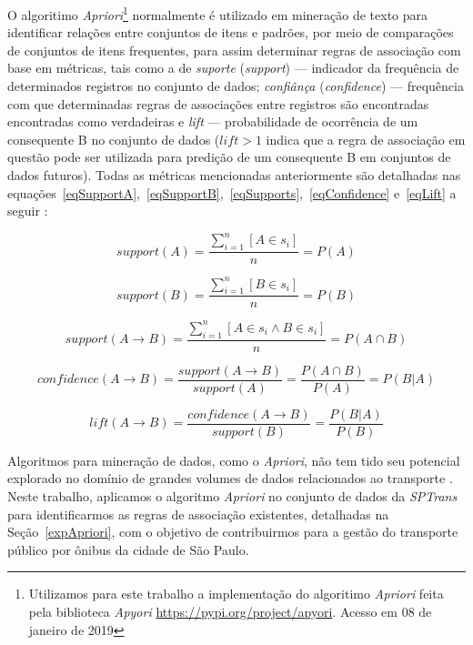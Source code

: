 \documentclass[
	12pt,				%
	oneside,			%
	a4paper,			%
	english,			%
	brazil				%
	]{abntex2ppgsi}
\begin{document}
{{{O algoritimo \textit{Apriori}\footnote{Utilizamos para este trabalho a implementação do algoritimo \textit{Apriori} feita pela biblioteca \textit{Apyori}  \url{https://pypi.org/project/apyori}. Acesso em 08 de janeiro de 2019} normalmente é utilizado em mineração de texto para identificar relações entre conjuntos de itens e padrões, por meio de comparações de conjuntos de itens frequentes, para assim determinar regras de associação com base em métricas, tais como a de \textit{suporte} (\textit{support}) --- indicador da frequência de determinados registros no conjunto de dados; \textit{confiânça} (\textit{confidence}) --- frequência com que determinadas regras de associações entre registros são encontradas encontradas como verdadeiras e \textit{lift} --- probabilidade de ocorrência de um consequente B no conjunto de dados ($lift > 1$ indica que a regra de associação em questão pode ser utilizada para predição de um consequente B em conjuntos de dados futuros). Todas as métricas mencionadas anteriormente são detalhadas nas equações~\ref{eqSupportA},~\ref{eqSupportB},~\ref{eqSupports},~\ref{eqConfidence} e~\ref{eqLift} a seguir  \cite{park2018apriori}:

\begin{equation}
\label{eqSupportA}
support(A) = \dfrac{\sum_{i=1}^{n}[A \in s_i]} {n} = P(A) 
\end{equation}

\begin{equation}
\label{eqSupportB}
support(B) = \dfrac{\sum_{i=1}^{n}[B \in s_i]} {n} = P(B) 
\end{equation}

\begin{equation}
\label{eqSupports}
support(A \rightarrow B) = \dfrac{\sum_{i=1}^{n}[A \in s_i \land B \in s_i]} {n} = P(A \cap B)
\end{equation}

\begin{equation}
\label{eqConfidence}
confidence(A \rightarrow B) = \dfrac{support(A \rightarrow B)}{support(A)} = \dfrac{P(A \cap B)}{P(A)} = P(B|A)
\end{equation}

\begin{equation}
\label{eqLift}
lift(A \rightarrow B) = \dfrac{confidence(A \rightarrow B)}{support(B)} = \dfrac{P(B|A)}{P(B)}
\end{equation}

Algoritmos para mineração de dados, como o \textit{Apriori}, não tem tido seu potencial explorado no domínio de grandes volumes de dados relacionados ao transporte \cite{park2018apriori}. Neste trabalho, aplicamos o algoritmo \textit{Apriori} no conjunto de dados da \textit{SPTrans} para identificarmos as regras de associação existentes, detalhadas na Seção~\ref{expApriori}, com o objetivo de contribuirmos para a gestão do transporte público por ônibus da cidade de São Paulo.   

}}}
\end{document}
